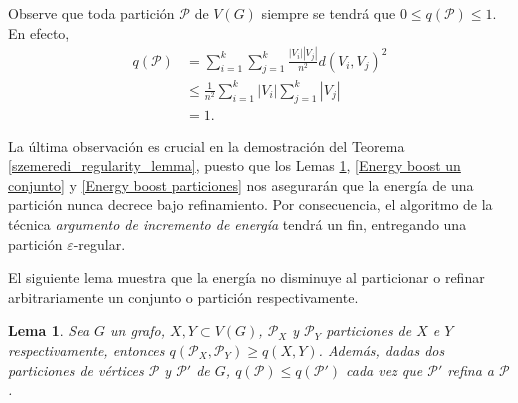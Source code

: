 \documentclass{article}[14pts]
\newtheorem{lema}{Lema}
\let\varepsilon=\varepsilon
\begin{document}
Observe que toda partición $\mathcal{P}$ de $V(G)$ siempre se tendrá que $0\leq q(\mathcal{P}) \leq 1$. En efecto,
\begin{align*}
    q(\mathcal{P}) &= \sum_{i = 1}^{k}\sum_{j = 1}^{k}\frac{|V_i||V_j|}{n^{2}}d(V_i,V_j)^{2}\\
    &\leq \frac{1}{n^{2}}\sum_{i = 1}^{k}|V_i|\sum_{j = 1}^{k}|V_j|\\
    &= 1.
\end{align*}\medskip

La última observación es crucial en la demostración del Teorema \ref{szemeredi_regularity_lemma}, puesto que los Lemas \ref{energia_no_decrece}, \ref{Energy boost un conjunto} y \ref{Energy boost particiones} nos asegurarán que la energía de una partición nunca decrece bajo refinamiento. Por consecuencia, el algoritmo de la técnica \emph{argumento de incremento de energía} tendrá un fin, entregando una partición $\varepsilon$-regular.\medskip

El siguiente lema muestra que la energía no disminuye al particionar o refinar arbitrariamente un conjunto o partición respectivamente.\medskip

\begin{lema} \label{energia_no_decrece}
    Sea $G$ un grafo, $X,Y\subset V(G)$, $\mathcal{P}_{X}$ y $\mathcal{P}_{Y}$ particiones de $X$ e $Y$ respectivamente, entonces $q(\mathcal{P}_{X}, \mathcal{P}_{Y}) \geq q(X,Y)$. Además, dadas dos particiones de vértices $\mathcal{P}$ y $\mathcal{P'}$ de $G$, $q(\mathcal{P}) \leq q(\mathcal{P'})$ cada vez que $\mathcal{P'}$ refina a $\mathcal{P}$. 
\end{lema}
\end{document}
